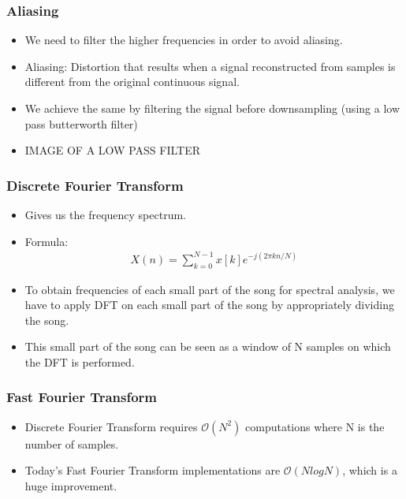 \documentclass{beamer}
\begin{document}
\begin{frame}[t]
    \frametitle{Aliasing}   
    \begin{itemize}
        \item We need to filter the higher frequencies in order to avoid aliasing.
        \item \alert{Aliasing}: Distortion that results when a signal reconstructed from samples is different from the original continuous signal.
        \item We achieve the same by filtering the signal before downsampling (using a low pass butterworth filter)
        \item IMAGE OF A LOW PASS FILTER       
    \end{itemize}
\end{frame}

\begin{frame}[t]
    \frametitle{Discrete Fourier Transform}
    \begin{itemize}
        \item Gives us the frequency spectrum.
        \item Formula: 
            \begin{align*}
                X(n) = \sum_{k=0}^{N-1} x[k] e^{-j(2\pi kn/N)}
            \end{align*}
        \item To obtain frequencies of each small part of the song for spectral analysis, we have to apply DFT on each small part of the song by appropriately dividing the song.
        \item This small part of the song can be seen as a window of N samples on which the DFT is performed.
    \end{itemize}
\end{frame}

\begin{frame}[t]
    \frametitle{Fast Fourier Transform}
    \begin{itemize}
        \item Discrete Fourier Transform requires \(\mathcal{O}(N^2)\) computations where N is the number of samples.
        \item Today's Fast Fourier Transform implementations are \(\mathcal{O}(NlogN)\), which is a huge improvement.
    \end{itemize}
\end{frame}    
\end{document}
